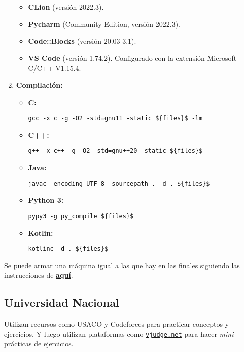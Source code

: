 \documentclass[12pt]{article}
\begin{document}
\begin{enumerate}
\begin{itemize}
\begin{itemize}
    \end{itemize}
  \item \textbf{CLion} (versión 2022.3).
  \item \textbf{Pycharm} (Community Edition, versión 2022.3).
  \item \textbf{Code::Blocks} (versión 20.03-3.1).
  \item \textbf{VS Code} (versión 1.74.2). Configurado con la extensión Microsoft C/C++ V1.15.4.
  \end{itemize}
\item \textbf{Compilación:}
\begin{itemize}
\item \textbf{C:}
\begin{lstlisting}
gcc -x c -g -O2 -std=gnu11 -static ${files}$ -lm
\end{lstlisting}
\item \textbf{C++:}
\begin{lstlisting}
g++ -x c++ -g -O2 -std=gnu++20 -static ${files}$
\end{lstlisting}
\item \textbf{Java:}
\begin{lstlisting}
javac -encoding UTF-8 -sourcepath . -d . ${files}$
\end{lstlisting}
\item \textbf{Python 3:}
\begin{lstlisting}
pypy3 -g py_compile ${files}$
\end{lstlisting}
\item \textbf{Kotlin:}
\begin{lstlisting}
kotlinc -d . ${files}$
\end{lstlisting}
\end{itemize}

\end{enumerate}

Se puede armar una máquina igual a las que hay en las finales siguiendo las instrucciones de \href{https://image.icpc.global/icpc2024/ImageBuildInstructions.html}{\textbf{aquí}}.



\subsection{Universidad Nacional}

Utilizan recursos como USACO y Codeforces para practicar conceptos y ejercicios. Y luego utilizan plataformas como \href{www.vjudge.net}{\texttt{vjudge.net}} para hacer \textit{mini} prácticas de ejercicios.
\end{document}
